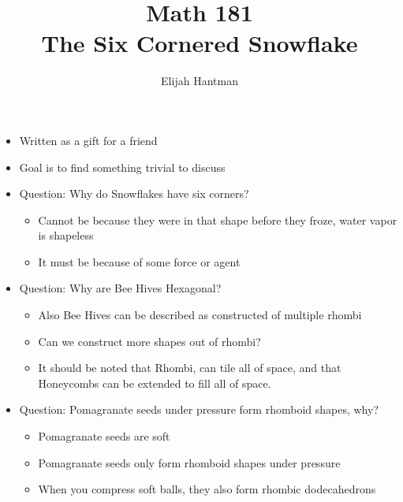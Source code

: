 \documentclass{report}
\title{\Huge{Math 181}\\The Six Cornered Snowflake}
\author{\huge{Elijah Hantman}}
\date{}
\begin{document}
\maketitle
\newpage

\begin{itemize}
    \item Written as a gift for a friend
    \item Goal is to find something trivial to discuss
    \item Question: Why do Snowflakes have six corners?
        \begin{mdframed}
            \begin{itemize}
                \item Cannot be because they were in
                    that shape before they froze,
                    water vapor is shapeless
                \item It must be because of some
                    force or agent
            \end{itemize}
        \end{mdframed}
    \item Question: Why are Bee Hives Hexagonal?
        \begin{mdframed}
            \begin{itemize}
                \item Also Bee Hives can be described
                    as constructed of multiple rhombi
                \item Can we construct more shapes out of
                    rhombi?
                \item It should be noted that Rhombi, can
                    tile all of space, and that Honeycombs
                    can be extended to fill all of space.
            \end{itemize}
        \end{mdframed}
    \item Question: Pomagranate seeds under pressure form
        rhomboid shapes, why?
        \begin{mdframed}
            \begin{itemize}
                \item Pomagranate seeds are soft
                \item Pomagranate seeds only form rhomboid
                    shapes under pressure
                \item When you compress soft balls,
                    they also form rhombic dodecahedrons

\end{itemize}
\end{mdframed}
\end{itemize}
\end{document}
